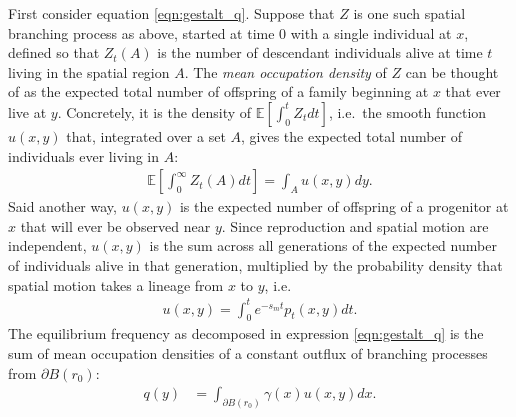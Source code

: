\documentclass{article}
\newcommand{\E}{\mathbb{E}}
\begin{document}
First consider equation \eqref{eqn:gestalt_q}.
Suppose that $Z$ is one such spatial branching process as above, started at time 0 with a single individual at $x$,
defined so that $Z_t(A)$ is the number of descendant individuals alive at time $t$ living in the spatial region $A$.
The \emph{mean occupation density} of $Z$ can be thought of 
as the expected total number of offspring of a family beginning at $x$ that ever live at $y$.
Concretely, it is the density of $\E[\int_0^t Z_t dt]$,
i.e.\ the smooth function $u(x,y)$ that, integrated over a set $A$, 
gives the expected total number of individuals ever living in $A$:
\begin{align} \label{eqn:occupation_density_defn}
    \E\left[ \int_0^\infty Z_t(A) dt \right] = \int_A u(x,y) dy .
\end{align}
Said another way, $u(x,y)$ is the expected number of offspring of a progenitor at $x$ that will ever be observed near $y$.
Since reproduction and spatial motion are independent,
$u(x,y)$ is the sum across all generations of the expected number of individuals alive in that generation,
multiplied by the probability density that spatial motion takes a lineage from $x$ to $y$,
i.e.\
\begin{align}
    u(x,y) = \int_0^t e^{-s_m t} p_t(x,y) dt .
\end{align}
The equilibrium frequency as decomposed in expression \eqref{eqn:gestalt_q} 
is the sum of mean occupation densities of a constant outflux of branching processes
from $\partial B(r_0)$:
\begin{align} \label{eqn:occupation_integral}
    q(y) &= \int_{\partial B(r_0)} \gamma(x) u(x,y) dx  . %
\end{align}
\end{document}
